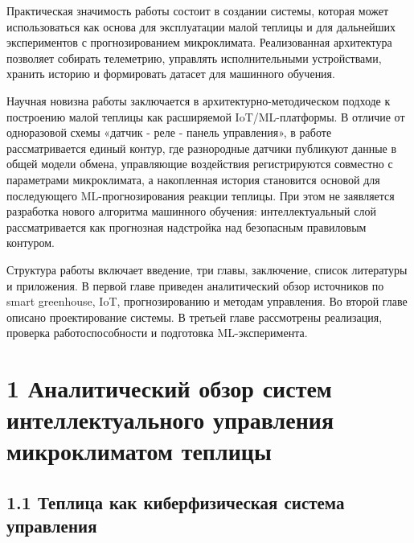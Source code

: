 \documentclass[a4paper,14pt]{extarticle}
\begin{document}
Практическая значимость работы состоит в создании системы, которая может
использоваться как основа для эксплуатации малой теплицы и для
дальнейших экспериментов с прогнозированием микроклимата. Реализованная
архитектура позволяет собирать телеметрию, управлять исполнительными
устройствами, хранить историю и формировать датасет для машинного
обучения.

Научная новизна работы заключается в архитектурно-методическом подходе к
построению малой теплицы как расширяемой IoT/ML-платформы. В отличие от
одноразовой схемы «датчик - реле - панель управления», в работе
рассматривается единый контур, где разнородные датчики публикуют данные
в общей модели обмена, управляющие воздействия регистрируются совместно
с параметрами микроклимата, а накопленная история становится основой для
последующего ML-прогнозирования реакции теплицы. При этом не заявляется
разработка нового алгоритма машинного обучения: интеллектуальный слой
рассматривается как прогнозная надстройка над безопасным правиловым
контуром.

Структура работы включает введение, три главы, заключение, список
литературы и приложения. В первой главе приведен аналитический обзор
источников по smart greenhouse, IoT, прогнозированию и методам
управления. Во второй главе описано проектирование системы. В третьей
главе рассмотрены реализация, проверка работоспособности и подготовка
ML-эксперимента.

\hypertarget{ux430ux43dux430ux43bux438ux442ux438ux447ux435ux441ux43aux438ux439-ux43eux431ux437ux43eux440-ux441ux438ux441ux442ux435ux43c-ux438ux43dux442ux435ux43bux43bux435ux43aux442ux443ux430ux43bux44cux43dux43eux433ux43e-ux443ux43fux440ux430ux432ux43bux435ux43dux438ux44f-ux43cux438ux43aux440ux43eux43aux43bux438ux43cux430ux442ux43eux43c-ux442ux435ux43fux43bux438ux446ux44b}{%
\section{1 Аналитический обзор систем интеллектуального управления
микроклиматом
теплицы}\label{ux430ux43dux430ux43bux438ux442ux438ux447ux435ux441ux43aux438ux439-ux43eux431ux437ux43eux440-ux441ux438ux441ux442ux435ux43c-ux438ux43dux442ux435ux43bux43bux435ux43aux442ux443ux430ux43bux44cux43dux43eux433ux43e-ux443ux43fux440ux430ux432ux43bux435ux43dux438ux44f-ux43cux438ux43aux440ux43eux43aux43bux438ux43cux430ux442ux43eux43c-ux442ux435ux43fux43bux438ux446ux44b}}

\hypertarget{ux442ux435ux43fux43bux438ux446ux430-ux43aux430ux43a-ux43aux438ux431ux435ux440ux444ux438ux437ux438ux447ux435ux441ux43aux430ux44f-ux441ux438ux441ux442ux435ux43cux430-ux443ux43fux440ux430ux432ux43bux435ux43dux438ux44f}{%
\subsection{1.1 Теплица как киберфизическая система
управления}\label{ux442ux435ux43fux43bux438ux446ux430-ux43aux430ux43a-ux43aux438ux431ux435ux440ux444ux438ux437ux438ux447ux435ux441ux43aux430ux44f-ux441ux438ux441ux442ux435ux43cux430-ux443ux43fux440ux430ux432ux43bux435ux43dux438ux44f}}
\end{document}
